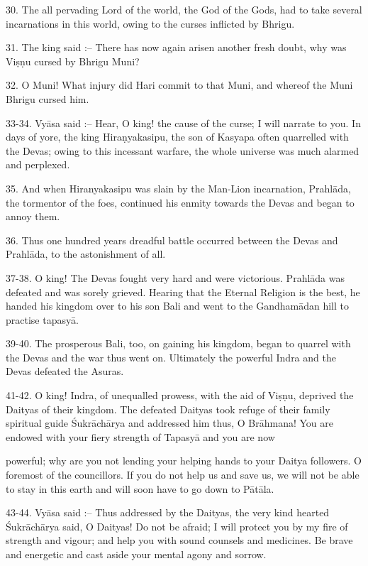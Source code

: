 30. The all pervading Lord of the world, the God of the Gods, had to take several incarnations in this world, owing to the curses inflicted by Bhrigu.

31. The king said :-- There has now again arisen another fresh doubt, why was Vi\d{s}\d{n}u cursed by Bhrigu Muni?

32. O Muni! What injury did Hari commit to that Muni, and whereof the Muni Bhrigu cursed him.

33-34. Vy\=asa said :-- Hear, O king! the cause of the curse; I will narrate to you. In days of yore, the king Hira\d{n}yakasipu, the son of Kasyapa often quarrelled with the Devas; owing to this incessant warfare, the whole universe was much alarmed and perplexed.

35. And when Hiranyakasipu was slain by the Man-Lion incarnation, Prahl\=ada, the tormentor of the foes, continued his enmity towards the Devas and began to annoy them.

36. Thus one hundred years dreadful battle occurred between the Devas and Prahl\=ada, to the astonishment of all.

37-38. O king! The Devas fought very hard and were victorious. Prahl\=ada was defeated and was sorely grieved. Hearing that the Eternal Religion is the best, he handed his kingdom over to his son Bali and went to the Gandham\=adan hill to practise tapasy\=a.

39-40. The prosperous Bali, too, on gaining his kingdom, began to quarrel with the Devas and the war thus went on. Ultimately the powerful Indra and the Devas defeated the Asuras.

41-42. O king! Indra, of unequalled prowess, with the aid of Vi\d{s}\d{n}u, deprived the Daityas of their kingdom. The defeated Daityas took refuge of their family spiritual guide \'Sukr\=ach\=arya and addressed him thus, O Br\=ahmana! You are endowed with your fiery strength of Tapasy\=a and you are now

powerful; why are you not lending your helping hands to your Daitya followers. O foremost of the councillors. If you do not help us and save us, we will not be able to stay in this earth and will soon have to go down to P\=at\=ala.

43-44. Vy\=asa said :-- Thus addressed by the Daityas, the very kind hearted \'Sukr\=ach\=arya said, O Daityas! Do not be afraid; I will protect you by my fire of strength and vigour; and help you with sound counsels and medicines. Be brave and energetic and cast aside your mental agony and sorrow.

